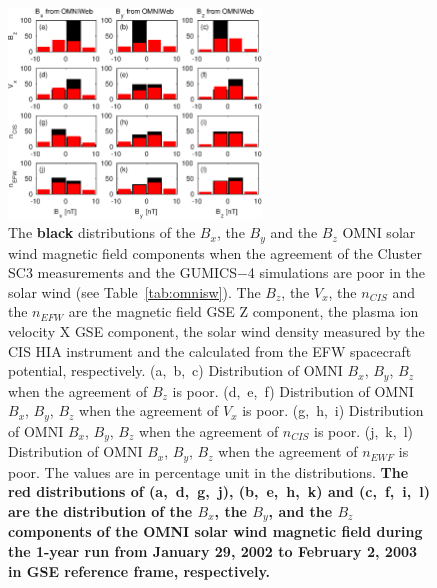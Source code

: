 \documentclass[linenumbers,draft]{agujournal}
\begin{document}
\begin{figure}[h]
\centering
\includegraphics[width=0.6\textwidth,angle=0]{swe-2021-corr-f13}  
\caption{The \textbf{black} distributions of the $B_{x}$, the $B_{y}$  and the $B_{z}$ OMNI solar wind magnetic field components when the agreement of the Cluster SC3 measurements and the GUMICS$-$4 simulations are poor in the solar wind (see Table~\ref{tab:omnisw}). The $B_{z}$, the $V_{x}$, the $n_{CIS}$ and the $n_{EFW}$ are the magnetic field GSE Z component, the plasma ion velocity X GSE component, the  solar wind density measured by the CIS HIA instrument and the calculated from the EFW spacecraft potential, respectively. (a,~b,~c) Distribution of OMNI $B_{x}$, $B_{y}$, $B_{z}$ when the agreement of $B_{z}$ is poor. (d,~e,~f) Distribution of OMNI  $B_{x}$, $B_{y}$, $B_{z}$ when the agreement of $V_{x}$ is poor. (g,~h,~i) Distribution of OMNI $B_{x}$, $B_{y}$, $B_{z}$ when the agreement of $n_{CIS}$ is poor. (j,~k,~l) Distribution of OMNI $B_{x}$, $B_{y}$, $B_{z}$ when the agreement of $n_{EWF}$ is poor. The values are in percentage unit in the distributions. \textbf{The red distributions of (a,~d,~g,~j), (b,~e,~h,~k) and (c,~f,~i,~l) are the distribution of the $B_{x}$, the $B_{y}$, and the $B_{z}$ components of the OMNI solar wind magnetic field during the 1-year run from January 29, 2002 to February 2, 2003 in GSE reference frame, respectively.}} 
\label{fig:swomnibxyz}
\end{figure}

\pagebreak
\end{document}
